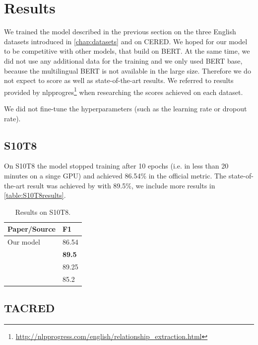\section{Results}

We trained the model described in the previous section on the three English datasets introduced in \autoref{chap:datasets} and on CERED. We hoped for our model to be competitive with other models, that build on BERT. At the same time, we did not use any additional data for the training and we only used BERT base, because the multilingual BERT is not available in the large size. Therefore we do not expect to score as well as state-of-the-art results. We referred to results provided by nlpprogres\footnote{\url{http://nlpprogress.com/english/relationship_extraction.html}} when researching the scores achieved on each dataset.

We did not fine-tune the hyperparameters (such as the learning rate or dropout rate). 


\subsection{S10T8}

On S10T8 the model stopped training after 10 epochs (i.e. in less than 20 minutes on a singe GPU) and achieved  86.54\% in the official metric. The state-of-the-art result was achieved by \cite{baldini-soares-etal-2019-matching} with 89.5\%, we include more results in \autoref{table:S10T8results}.


\begin{table}[h]
\centering
\caption{Results on S10T8.}
\label{table:S10T8results}
\begin{tabular}{l l }
\hline
Paper/Source & F1 \\
\hline
\hline
Our model & 86.54 \\
\textbf{\cite{baldini-soares-etal-2019-matching}} & \textbf{89.5} \\
\textit{\cite{DBLP:journals/corr/abs-1905-08284}} & 89.25 \\
\textit{\cite{DBLP:journals/corr/abs-1901-08163}} & 85.2 \\
\hline

\end{tabular}
\end{table}


\subsection{TACRED}

